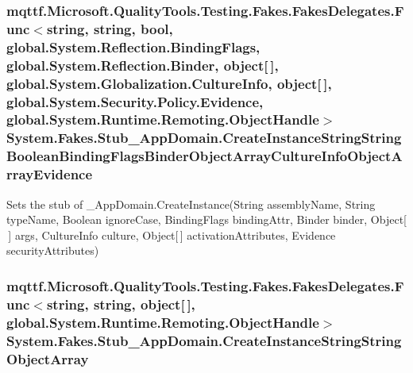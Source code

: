 \hypertarget{class_system_1_1_fakes_1_1_stub___app_domain_ac74b417b8300cae00107de68e43bf723}{
\subsubsection[{Create\-Instance\-String\-String\-Boolean\-Binding\-Flags\-Binder\-Object\-Array\-Culture\-Info\-Object\-Array\-Evidence}]{\setlength{\rightskip}{0pt plus 5cm}mqttf.\-Microsoft.\-Quality\-Tools.\-Testing.\-Fakes.\-Fakes\-Delegates.\-Func$<$string, string, bool, global.\-System.\-Reflection.\-Binding\-Flags, global.\-System.\-Reflection.\-Binder, object\mbox{[}$\,$\mbox{]}, global.\-System.\-Globalization.\-Culture\-Info, object\mbox{[}$\,$\mbox{]}, global.\-System.\-Security.\-Policy.\-Evidence, global.\-System.\-Runtime.\-Remoting.\-Object\-Handle$>$ System.\-Fakes.\-Stub\-\_\-\-App\-Domain.\-Create\-Instance\-String\-String\-Boolean\-Binding\-Flags\-Binder\-Object\-Array\-Culture\-Info\-Object\-Array\-Evidence}}\label{class_system_1_1_fakes_1_1_stub___app_domain_ac74b417b8300cae00107de68e43bf723}


Sets the stub of \-\_\-\-App\-Domain.\-Create\-Instance(\-String assembly\-Name, String type\-Name, Boolean ignore\-Case, Binding\-Flags binding\-Attr, Binder binder, Object\mbox{[}$\,$\mbox{]} args, Culture\-Info culture, Object\mbox{[}$\,$\mbox{]} activation\-Attributes, Evidence security\-Attributes)

\hypertarget{class_system_1_1_fakes_1_1_stub___app_domain_adda47e1f03686b2e7ea8223f96e160de}{
\subsubsection[{Create\-Instance\-String\-String\-Object\-Array}]{\setlength{\rightskip}{0pt plus 5cm}mqttf.\-Microsoft.\-Quality\-Tools.\-Testing.\-Fakes.\-Fakes\-Delegates.\-Func$<$string, string, object\mbox{[}$\,$\mbox{]}, global.\-System.\-Runtime.\-Remoting.\-Object\-Handle$>$ System.\-Fakes.\-Stub\-\_\-\-App\-Domain.\-Create\-Instance\-String\-String\-Object\-Array}}\label{class_system_1_1_fakes_1_1_stub___app_domain_adda47e1f03686b2e7ea8223f96e160de}


